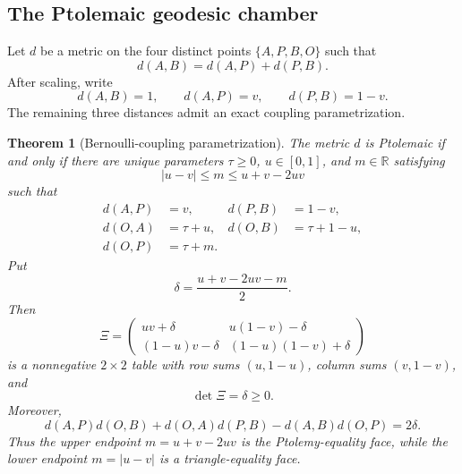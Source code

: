 \documentclass[11pt]{amsart}
\newtheorem{theorem}{Theorem}[section]
\theoremstyle{definition}
\theoremstyle{remark}
\newcommand{\R}{\mathbb R}
\begin{document}
\subsection{The Ptolemaic geodesic chamber}

Let \(d\) be a metric on the four distinct points \(\{A,P,B,O\}\) such that
\[
 d(A,B)=d(A,P)+d(P,B).
\]
After scaling, write
\[
 d(A,B)=1,
 \qquad d(A,P)=v,
 \qquad d(P,B)=1-v.
\]
The remaining three distances admit an exact coupling parametrization.

\begin{theorem}[Bernoulli-coupling parametrization]\label{thm:coupling-chart}
The metric \(d\) is Ptolemaic if and only if there are unique
parameters $\tau\geq0$, $u\in[0,1]$, and $m\in\R$ satisfying
\[
 |u-v|\leq m\leq u+v-2uv
\]
such that
\begin{equation}\label{eq:coupling-distances}
 \begin{aligned}
 d(A,P)&=v,& d(P,B)&=1-v,\\
 d(O,A)&=\tau+u,& d(O,B)&=\tau+1-u,\\
 d(O,P)&=\tau+m.&
 \end{aligned}
\end{equation}
Put
\[
 \delta=\frac{u+v-2uv-m}{2}.
\]
Then
\begin{equation}\label{eq:coupling-table}
 \Xi=
 \begin{pmatrix}
 uv+\delta&u(1-v)-\delta\\
 (1-u)v-\delta&(1-u)(1-v)+\delta
 \end{pmatrix}
\end{equation}
is a nonnegative \(2\times2\) table with row sums \((u,1-u)\), column sums \((v,1-v)\), and
\[
 \det\Xi=\delta\geq0.
\]
Moreover,
\begin{equation}\label{eq:ptolemy-slack-delta}
 d(A,P)d(O,B)+d(O,A)d(P,B)-d(A,B)d(O,P)=2\delta.
\end{equation}
Thus the upper endpoint \(m=u+v-2uv\) is the Ptolemy-equality face, while the lower endpoint \(m=|u-v|\) is a triangle-equality face.
\end{theorem}
\end{document}

